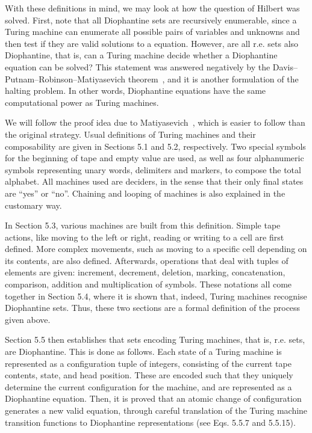 \documentclass[12pt]{article}
\begin{document}
With these definitions in mind, we may look at how the question of Hilbert was solved. First, note that all Diophantine sets are recursively enumerable, since a Turing machine can enumerate all possible pairs of variables and unknowns and then test if they are valid solutions to a equation. However, are all r.e. sets also Diophantine, that is, can a Turing machine decide whether a Diophantine equation can be solved? This statement was answered negatively by the Davis--Putnam--Robinson--Matiyasevich theorem~\cite{}, and it is another formulation of the halting problem. In other words, Diophantine equations have the same computational power as Turing machines.

We will follow the proof idea due to Matiyasevich~\cite[Chap. 5]{Matiyasevich:book:1993}, which is easier to follow than the original strategy. Usual definitions of Turing machines and their composability are given in Sections 5.1 and 5.2, respectively. Two special symbols for the beginning of tape and empty value are used, as well as four alphanumeric symbols representing unary words, delimiters and markers, to compose the total alphabet. All machines used are deciders, in the sense that their only final states are ``yes'' or ``no''. Chaining and looping of machines is also explained in the customary way.

In Section 5.3, various machines are built from this definition. Simple tape actions, like moving to the left or right, reading or writing to a cell are first defined. More complex movements, such as moving to a specific cell depending on its contents, are also defined. Afterwards, operations that deal with tuples of elements are given: increment, decrement, deletion, marking, concatenation, comparison, addition and multiplication of symbols. These notations all come together in Section 5.4, where it is shown that, indeed, Turing machines recognise Diophantine sets. Thus, these two sections are a formal definition of the process given above.

Section 5.5 then establishes that sets encoding Turing machines, that is, r.e. sets, are Diophantine. This is done as follows. Each state of a Turing machine is represented as a configuration tuple of integers, consisting of the current tape contents, state, and head position. These are encoded such that they uniquely determine the current configuration for the machine, and are represented as a Diophantine equation. Then, it is proved that an atomic change of configuration generates a new valid equation, through careful translation of the Turing machine transition functions to Diophantine representations (see Eqs. 5.5.7 and 5.5.15).
\end{document}
